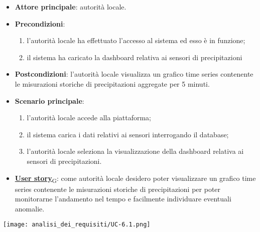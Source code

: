 \begin{itemize}
	\item \textbf{Attore principale}: autorità locale.
	\item \textbf{Precondizioni}:
	      \begin{enumerate}
		      \item l'autorità locale ha effettuato l'accesso al sistema ed esso è in funzione;
		      \item il sistema ha caricato la dashboard relativa ai sensori di precipitazioni
	      \end{enumerate}
	\item \textbf{Postcondizioni}: l'autorità locale visualizza un grafico time series contenente le misurazioni storiche
	      di precipitazioni aggregate per 5 minuti.
	\item \textbf{Scenario principale}:
	      \begin{enumerate}
		      \item l'autorità locale accede alla piattaforma;
		      \item il sistema carica i dati relativi ai sensori interrogando il database;
		      \item l'autorità locale seleziona la visualizzazione della dashboard relativa ai sensori di precipitazioni.
	      \end{enumerate}
	\item \href{https://7last.github.io/docs/rtb/documentazione-interna/glossario\#user-story}{\textbf{User story}\textsubscript{G}}:
	      come autorità locale desidero poter visualizzare un grafico time series contenente le misurazioni storiche
	      di precipitazioni per poter monitorarne l'andamento nel tempo e facilmente individuare eventuali anomalie.
\end{itemize}
\begin{center}
	\texttt{[image: analisi\_dei\_requisiti/UC-6.1.png]}
\end{center}


